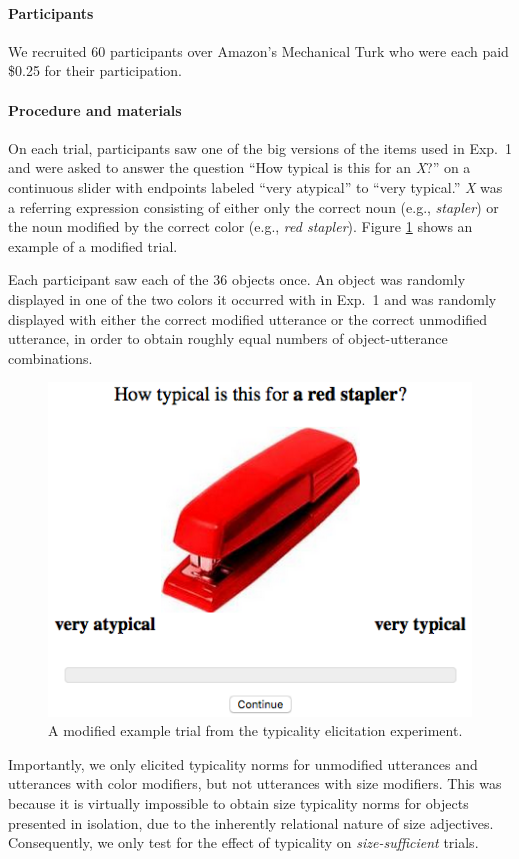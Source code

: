 \documentclass[11pt]{article}
\newcommand{\figref}[1]{Figure \ref{#1}}
\begin{document}
\paragraph{Participants}

We recruited 60 participants over Amazon's Mechanical Turk who were each paid \$0.25 for their participation.

\paragraph{Procedure and materials}

On each trial, participants saw one of the big versions of the items used in Exp.~1 and were asked to answer the question ``How typical is this for an \emph{X}?'' on a continuous slider with endpoints labeled ``very atypical'' to ``very typical.'' \emph{X} was a referring expression consisting of either only the correct noun (e.g., \emph{stapler}) or the noun modified by the correct color (e.g., \emph{red stapler}). \figref{fig:modifiertypstimulus} shows an example of a modified trial.

Each participant saw each of the 36 objects once. An object was randomly displayed in one of the two colors it occurred with in Exp.~1 and was randomly displayed with either the correct modified utterance or the correct unmodified utterance, in order to obtain roughly equal numbers of object-utterance combinations.

\begin{figure}
\centering
\includegraphics[width=.5\textwidth]{pics/redstapler.png}
\caption{A modified example trial from the typicality elicitation experiment.}
\label{fig:modifiertypstimulus}
\end{figure}

Importantly, we only elicited typicality norms for unmodified utterances and utterances with color modifiers, but not utterances with size modifiers. This was because it is virtually impossible to obtain size typicality norms for objects presented in isolation, due to the inherently relational nature of size adjectives. Consequently, we only test for the effect of typicality on \emph{size-sufficient} trials.
\end{document}
